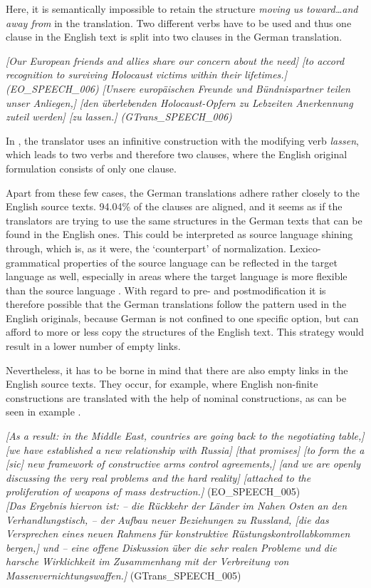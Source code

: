 \documentclass[output=paper]{LSP/langsci}
\begin{document}
 
\newpage 
Here, it is semantically impossible to retain the structure \textit{moving us toward\ldots and away from} in the translation. Two different verbs have to be used and thus one clause in the English text is split into two clauses in the German translation.

\ea \label{ex:culo:17}
   \ea \textit{[Our European friends and allies share our concern about the need] [to accord recognition to surviving Holocaust victims within their lifetimes.] \textup{(EO\_SPEECH\_006)} }
    \ex \textit{[Unsere europäischen Freunde und Bündnispartner teilen unser Anliegen,] [den   überlebenden Holocaust-Opfern zu Lebzeiten Anerkennung zuteil werden] [zu lassen.] \textup{(GTrans\_SPEECH\_006)}}
    \z
\z

In , the translator uses an infinitive construction with the modifying verb \textit{lassen}, which leads to two verbs and therefore two clauses, where the English original formulation consists of only one clause. 

Apart from these few cases, the German translations adhere rather closely to the English source texts. 94.04\% of the clauses are aligned, and it seems as if the translators are trying to use the same structures in the German texts that can be found in the English ones. This could be interpreted as source language shining through, which is, as it were, the `counterpart' of normalization. Lexico-grammatical properties of the source language can be reflected in the target language as well, especially in areas where the target language is more flexible than the source language \citep[218]{Teich2003}. With regard to pre- and postmodification it is therefore possible that the German translations follow the pattern used in the English originals, because German is not confined to one specific option, but can afford to more or less copy the structures of the English text. This strategy would result in a lower number of empty links. 

Nevertheless, it has to be borne in mind that there are also empty links in the English source texts. They occur, for example, where English non-finite constructions are translated with the help of nominal constructions, as can be seen in example . 

\ea \label{ex:culo:18}
   \ea 
   \textit{[As a result: in the Middle East, countries are going back to the negotiating table,] [we have established a new relationship with Russia] [that promises] [to form the a [\textup{sic}] new framework of constructive arms control agreements,] [and we are openly   discussing the very real problems and the hard reality] [attached to the proliferation of   weapons of mass destruction.]} \textup{(EO\_SPEECH\_005)}\\
   \ex \textit{[Das Ergebnis hiervon ist: -- die Rückkehr der Länder im Nahen Osten an den Verhandlungstisch, -- der Aufbau neuer Beziehungen zu Russland, [die das Versprechen eines neuen Rahmens für konstruktive Rüstungskontrollabkommen bergen,] und -- eine offene Diskussion über die sehr realen Probleme und die harsche Wirklichkeit im   Zusammenhang mit der Verbreitung von Massenvernichtungswaffen.]}  (GTrans\_SPEECH\_005)
   \z
\z
\end{document}
